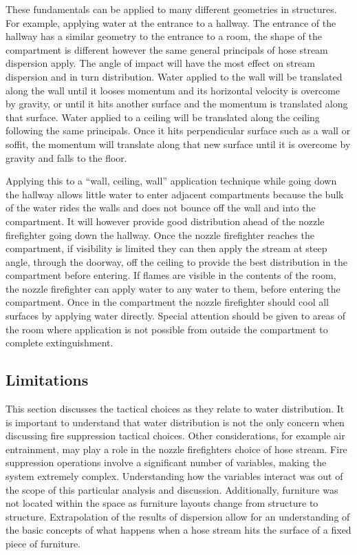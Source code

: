 \documentclass[12pt,oneside]{book}
\begin{document}
These fundamentals can be applied to many different geometries in structures. For example, applying water at the entrance to a hallway. The entrance of the hallway has a similar geometry to the entrance to a room, the shape of the compartment is different however the same general principals of hose stream dispersion apply. The angle of impact will have the most effect on stream dispersion and in turn distribution.  Water applied to the wall will be translated along the wall until it looses momentum and its horizontal velocity is overcome by gravity, or until it hits another surface and the momentum is translated along that surface. Water applied to a ceiling will be translated along the ceiling following the same principals. Once it hits perpendicular surface such as a wall or soffit, the momentum will translate along that new surface until it is overcome by gravity and falls to the floor. 

Applying this to a ``wall, ceiling, wall'' application technique while going down the hallway allows little water to enter adjacent compartments because the bulk of the water rides the walls and does not bounce off the wall and into the compartment. It will however provide good distribution ahead of the nozzle firefighter going down the hallway. Once the nozzle firefighter reaches the compartment, if visibility is limited they can then apply the stream at steep angle, through the doorway, off the ceiling to provide the best distribution in the compartment before entering. If flames are visible in the contents of the room, the nozzle firefighter can apply water to any water to them, before entering the compartment. Once in the compartment the nozzle firefighter should cool all surfaces by applying water directly. Special attention should be given to areas of the room where application is not possible from outside the compartment to complete extinguishment.

\clearpage

\subsection{Limitations}

This section discusses the tactical choices as they relate to water distribution. It is important to understand that water distribution is not the only concern when discussing fire suppression tactical choices. Other considerations, for example air entrainment, may play a role in the nozzle firefighters choice of hose stream. Fire suppression operations involve a significant number of variables, making the system extremely complex. Understanding how the variables interact was out of the scope of this particular analysis and discussion. Additionally, furniture was not located within the space as furniture layouts change from structure to structure. Extrapolation of the results of dispersion allow for an understanding of the basic concepts of what happens when a hose stream hits the surface of a fixed piece of furniture. 
\end{document}
